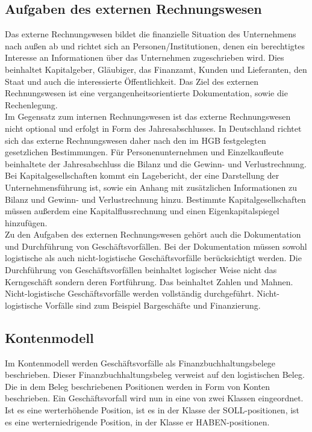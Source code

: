 \subsection{Aufgaben des externen Rechnungswesen}
Das externe Rechnungswesen bildet die finanzielle Situation des Unternehmens nach außen ab und richtet sich an Personen/Institutionen, denen ein berechtigtes Interesse an Informationen über das Unternehmen zugeschrieben wird. Dies beinhaltet Kapitalgeber, Gläubiger, das Finanzamt, Kunden und Lieferanten, den Staat und auch die interessierte Öffentlichkeit. Das Ziel des externen Rechnungswesen ist eine vergangenheitsorientierte Dokumentation, sowie die Rechenlegung. 
\\
Im Gegensatz zum internen Rechnungswesen ist das externe Rechnungswesen nicht optional und erfolgt in Form des Jahresabschlusses. In Deutschland richtet sich das externe Rechnungswesen daher nach den im HGB festgelegten gesetzlichen Bestimmungen. Für Personenunternehmen und Einzelkaufleute beinhaltete der Jahresabschluss die Bilanz und die Gewinn- und Verlustrechnung. Bei Kapitalgesellschaften kommt ein Lagebericht, der eine Darstellung der Unternehmensführung ist, sowie ein Anhang mit zusätzlichen Informationen zu Bilanz und Gewinn- und Verlustrechnung hinzu. Bestimmte Kapitalgesellschaften müssen außerdem eine Kapitalflussrechnung und einen Eigenkapitalspiegel hinzufügen.\cite{boeckler}
\\
Zu den Aufgaben des externen Rechnungswesen gehört auch die Dokumentation und Durchführung von Geschäftsvorfällen. Bei der Dokumentation müssen sowohl logistische als auch nicht-logistische Geschäftsvorfälle berücksichtigt werden. Die Durchführung von Geschäftsvorfällen beinhaltet logischer Weise nicht das Kerngeschäft sondern deren Fortführung. Das beinhaltet Zahlen und Mahnen. Nicht-logistische Geschäftsvorfälle werden vollständig durchgeführt. Nicht-logistische Vorfälle sind zum Beispiel Bargeschäfte und Finanzierung.

\subsection{Kontenmodell}
Im Kontenmodell werden Geschäftsvorfälle als Finanzbuchhaltungsbelege beschrieben. Dieser Finanzbuchhaltungsbeleg verweist auf den logistischen Beleg. Die in dem Beleg beschriebenen Positionen werden in Form von Konten beschrieben. Ein Geschäftsvorfall wird nun in eine von zwei Klassen eingeordnet. Ist es eine werterhöhende Position, ist es in der Klasse der SOLL-positionen, ist es eine werterniedrigende Position, in der Klasse er HABEN-positionen.

